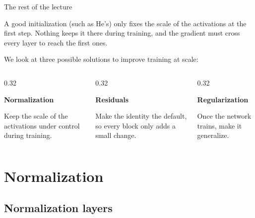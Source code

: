 \documentclass[11pt,aspectratio=169]{beamer}
\begin{document}
\begin{frame}{The rest of the lecture}
    \setlength{\parskip}{6pt}

    A good initialization (such as He's) only fixes the scale of the
    activations at the first step. Nothing keeps it there during training, and
    the gradient must cross every layer to reach the first ones.

    We look at three possible solutions to improve training at scale:

    \begin{columns}[T,onlytextwidth]
        \begin{column}{0.32\textwidth}
            \begin{tcolorbox}[nndsblue,courseheight={roadmap}{}]
                \textbf{Normalization}

                Keep the scale of the activations under control during training.
            \end{tcolorbox}
        \end{column}
        \begin{column}{0.32\textwidth}
            \begin{tcolorbox}[nndsred,courseheight={roadmap}{}]
                \textbf{Residuals}

                Make the identity the default, so every block only adds a small change.
            \end{tcolorbox}
        \end{column}
        \begin{column}{0.32\textwidth}
            \begin{tcolorbox}[nndsgreen,courseheight={roadmap}{}]
                \textbf{Regularization}

                Once the network trains, make it generalize.
            \end{tcolorbox}
        \end{column}
    \end{columns}

\end{frame}

\section{Normalization}
\subsection{Normalization layers}
\end{document}
